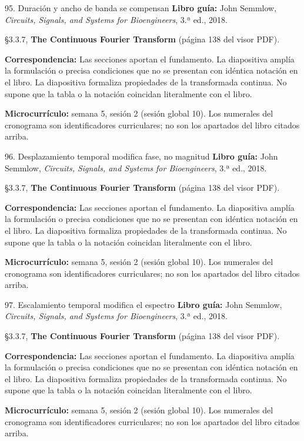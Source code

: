 \documentclass[
  10pt,
  ignorenonframetext,
  aspectratio=169,
  spanish,
]{beamer}
\begin{document}
\begin{frame}{95. Duración y ancho de banda se compensan}
\label{duraciuxf3n-y-ancho-de-banda-se-compensan}
\textbf{Libro guía:} John Semmlow, \emph{Circuits, Signals, and Systems
for Bioengineers}, 3.ª ed., 2018.

§3.3.7, \textbf{The Continuous Fourier Transform} (página 138 del visor
PDF).

\textbf{Correspondencia:} Las secciones aportan el fundamento. La
diapositiva amplía la formulación o precisa condiciones que no se
presentan con idéntica notación en el libro. La diapositiva formaliza
propiedades de la transformada continua. No supone que la tabla o la
notación coincidan literalmente con el libro.

\textbf{Microcurrículo:} semana 5, sesión 2 (sesión global 10). Los
numerales del cronograma son identificadores curriculares; no son los
apartados del libro citados arriba.
\end{frame}

\begin{frame}{96. Desplazamiento temporal modifica fase, no magnitud}
\label{desplazamiento-temporal-modifica-fase-no-magnitud}
\textbf{Libro guía:} John Semmlow, \emph{Circuits, Signals, and Systems
for Bioengineers}, 3.ª ed., 2018.

§3.3.7, \textbf{The Continuous Fourier Transform} (página 138 del visor
PDF).

\textbf{Correspondencia:} Las secciones aportan el fundamento. La
diapositiva amplía la formulación o precisa condiciones que no se
presentan con idéntica notación en el libro. La diapositiva formaliza
propiedades de la transformada continua. No supone que la tabla o la
notación coincidan literalmente con el libro.

\textbf{Microcurrículo:} semana 5, sesión 2 (sesión global 10). Los
numerales del cronograma son identificadores curriculares; no son los
apartados del libro citados arriba.
\end{frame}

\begin{frame}{97. Escalamiento temporal modifica el espectro}
\label{escalamiento-temporal-modifica-el-espectro}
\textbf{Libro guía:} John Semmlow, \emph{Circuits, Signals, and Systems
for Bioengineers}, 3.ª ed., 2018.

§3.3.7, \textbf{The Continuous Fourier Transform} (página 138 del visor
PDF).

\textbf{Correspondencia:} Las secciones aportan el fundamento. La
diapositiva amplía la formulación o precisa condiciones que no se
presentan con idéntica notación en el libro. La diapositiva formaliza
propiedades de la transformada continua. No supone que la tabla o la
notación coincidan literalmente con el libro.

\textbf{Microcurrículo:} semana 5, sesión 2 (sesión global 10). Los
numerales del cronograma son identificadores curriculares; no son los
apartados del libro citados arriba.
\end{frame}
\end{document}
